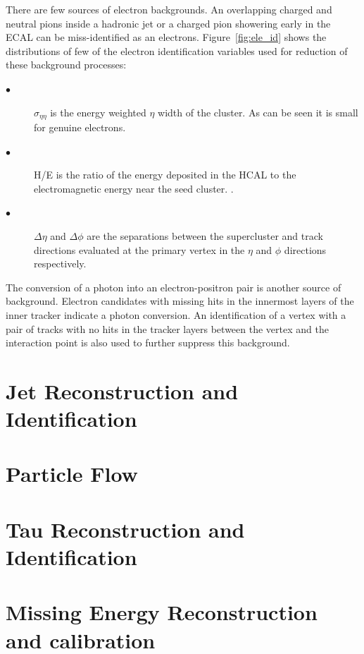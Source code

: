 There are few sources of electron backgrounds. An overlapping charged and neutral pions inside a hadronic jet or a charged pion showering early in the ECAL can be miss-identified as an electrons. Figure~\ref{fig:ele_id} shows the distributions of few of the electron identification variables used for reduction of these background processes:
 
\begin{description}
\item[$\bullet$]  $\sigma_{\eta\eta}$ is the energy weighted $\eta$ width of the cluster. As can be seen it is small for genuine electrons.  
\item[$\bullet$]  H/E is the ratio of the energy deposited in the HCAL to the electromagnetic energy near the seed cluster. .
\item[$\bullet$] $\Delta \eta$ and $\Delta \phi$ are the separations between the supercluster and track directions evaluated at the primary vertex in the $\eta$ and $\phi$ directions respectively.  
\end{description}

The conversion of a photon into an electron-positron pair is another source of background. Electron candidates with missing hits in the innermost layers of the inner tracker indicate a photon conversion. An identification of a vertex with a pair of tracks with no hits in the tracker layers between the vertex and the interaction point is also used to further suppress this background.

\section{Jet Reconstruction and Identification}

\section{Particle Flow}

\section{Tau Reconstruction and Identification}

\section{Missing Energy Reconstruction and calibration}